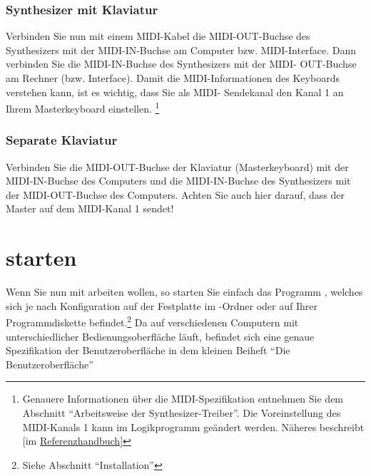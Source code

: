 \subsection{Synthesizer mit Klaviatur}\label{sec:synth-mit-klav}

Verbinden Sie nun mit einem MIDI-Kabel die MIDI-OUT-Buchse des
Synthesizers mit der MIDI-IN-Buchse am Computer bzw. MIDI-Interface.
Dann verbinden Sie die MIDI-IN-Buchse des Synthesizers mit der MIDI-
OUT-Buchse am Rechner (bzw. Interface).  Damit \mutabor{} die
MIDI-Informationen des Keyboards verstehen kann, ist es wichtig, dass
Sie als MIDI-  Sendekanal den Kanal 1 an Ihrem
Masterkeyboard einstellen.%
\footnote{Genauere Informationen über die MIDI-Spezifikation entnehmen
  Sie dem Abschnitt "`Arbeitsweise der Synthesizer-Treiber"'.  Die
  Voreinstellung des MIDI-Kanals 1 kann im Logikprogramm geändert
  werden. Näheres beschreibt
  [im \href{\makefilename{referenz}}{Referenzhandbuch}]}

\subsection{Separate Klaviatur}\label{sec:separate-klaviatur}

Verbinden Sie die MIDI-OUT-Buchse der Klaviatur (Masterkeyboard)
mit der MIDI-IN-Buchse des Computers und die MIDI-IN-Buchse
des Synthesizers mit der MIDI-OUT-Buchse des Computers. Achten Sie
auch hier darauf, dass der Master auf dem MIDI-Kanal 1 sendet!

\chapter[{\mutabor{} starten}]{\mutabor{} starten}\label{cha:mutabor-starten}


 Wenn Sie nun mit \mutabor{}
arbeiten wollen, so starten Sie einfach das Programm ,
welches sich je nach Konfiguration auf der Festplatte im
\mutabor{}-Ordner oder auf Ihrer Programmdiskette
befindet.\footnote{Siehe Abschnitt "`Installation"'} Da \mutabor{} auf
verschiedenen Computern mit unterschiedlicher Bedienungsoberfläche
läuft, befindet sich eine genaue Spezifikation der Benutzeroberfläche
in dem kleinen Beiheft "`Die Benutzeroberfläche"'

